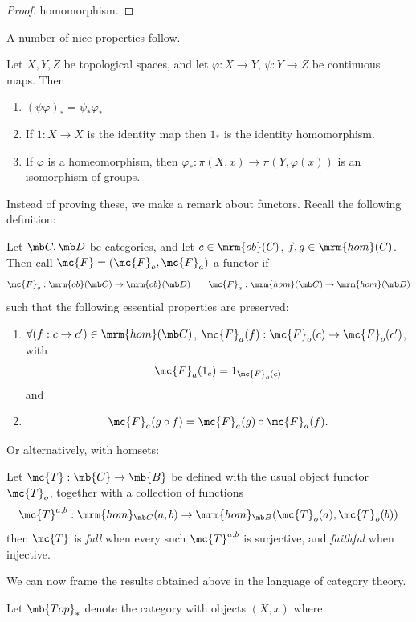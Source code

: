 \documentclass[nocover]{pset}
\newcommand{\homm}{\ensuremath\mrm{hom}}
\newcommand{\ob}{\ensuremath\mrm{ob}}
\begin{document}
\begin{adjustwidth}{1em}{1em}
\begin{proof}
    homomorphism.
  \end{proof}
  A number of nice properties follow.
  \begin{theorem}
    Let $X,Y,Z$ be topological spaces, and let $\varphi : X \to Y$,
    $\psi : Y \to Z$ be continuous maps. Then
    \begin{enumerate}[label=\arabic*)]
      \item $(\psi \varphi)_* = \psi_* \varphi_*$
      \item If $1 : X \to X$ is the identity map then $1_*$ is the
        identity homomorphism.
      \item If $\varphi$ is a homeomorphism, then $\varphi_* :
        \pi(X,x) \to \pi(Y, \varphi(x))$ is an isomorphism of groups.
    \end{enumerate}
  \end{theorem}
  Instead of proving these, we make a remark about functors. Recall
  the following definition:
  \begin{definition}[Functor]
    Let $\mb C, \mb D$ be categories, and let $c \in \ob(C)$, $f,g \in
    \homm(C)$. Then call $\mc{F} = (\mc{F}_o, \mc{F}_a)$ a functor if
    \[
      \mc{F}_o : \ob(\mb C) \to \ob(\mb D) \qquad \mc{F}_a : \homm(\mb
      C) \to \homm(\mb D)
    \]
    such that the following essential properties are preserved:
    \begin{enumerate}
    \item $\forall (f : c \to c') \in \homm(\mb C)$, $\mc{F}_a(f) :
      \mc{F}_o(c) \to \mc{F}_o(c')$, with
      \[
        \mc{F}_a(1_{c}) = 1_{\mc{F}_o(c)}
      \]
      and
    \item
      \[
        \mc{F}_a(g \circ f) = \mc{F}_a(g) \circ \mc{F}_a(f).
      \]
    \end{enumerate}
  \end{definition}
  Or alternatively, with homsets:
  \begin{definition}
    Let $\mc{T} : \mb{C} \to \mb{B}$ be defined with the usual object
    functor $\mc{T}_o$, together with a collection of functions
    \[
      \mc{T}^{a,b} : \homm_{\mb C}(a,b) \to \homm_{\mb B}(\mc{T}_o(a),
      \mc{T}_o(b))
    \]
    then $\mc{T}$ is \emph{full} when every such $\mc{T}^{a,b}$ is
    surjective, and \emph{faithful} when injective.
  \end{definition}
  We can now frame the results obtained above in the language of
  category theory.
  \begin{theorem}
    Let $\mb{Top}_*$ denote the category with objects $(X,x)$ where

\end{theorem}
\end{adjustwidth}
\end{document}
